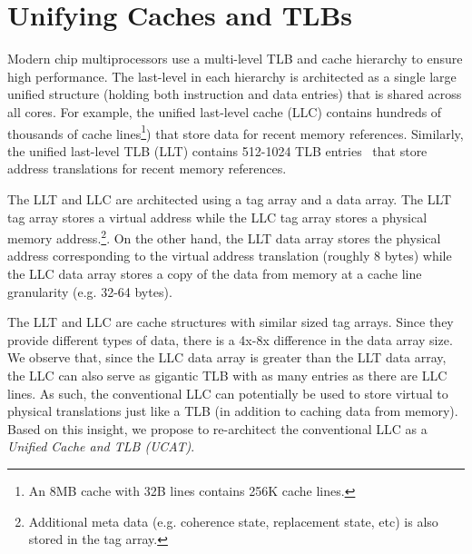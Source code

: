 \section{Unifying Caches and TLBs}
\label{sec:UCAT}

\noindent Modern chip multiprocessors use a multi-level TLB and cache
hierarchy to ensure high performance. The last-level in each hierarchy
is architected as a single large unified structure (holding both
instruction and data entries) that is shared across all cores. For
example, the unified last-level cache (LLC) contains hundreds
of thousands of cache lines\footnote{An 8MB cache with 32B lines contains
256K cache lines.}) that store data for recent memory references.
Similarly, the unified last-level TLB (LLT) contains 512-1024 TLB
entries~\cite{} that store address translations for recent memory
references.

The LLT and LLC are architected using a tag array and a data array.
The LLT tag array stores a virtual address while the LLC tag array
stores a physical memory address.\footnote{Additional meta data (e.g.
coherence state, replacement state, etc) is also stored in the tag
array.}. On the other hand, the LLT data array stores the physical
address corresponding to the virtual address translation (roughly 8
bytes) while the LLC data array stores a copy of the data from memory
at a cache line granularity (e.g. 32-64 bytes).

The LLT and LLC are cache structures with similar sized tag arrays.
Since they provide different types of data, there is a 4x-8x
difference in the data array size. We observe that, since the LLC data
array is greater than the LLT data array, the LLC can also serve as
gigantic TLB with as many entries as there are LLC lines. 
As such, the conventional LLC can potentially be used to store virtual to physical
translations just like a TLB (in addition to caching data from
memory). Based on this insight, we propose to re-architect the
conventional LLC as a {\em Unified Cache and TLB (UCAT)}.


